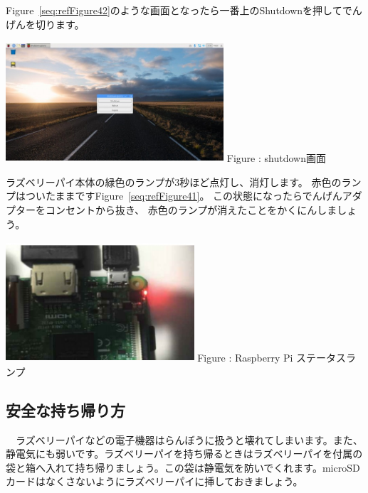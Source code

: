 \documentclass[a4paper,12pt]{jarticle}
\newcounter{Figure}
\renewcommand\theFigure{\arabic{Figure}}
\begin{document}
\flushleft
\textcolor[rgb]{0.13333334,0.13333334,0.13333334}{Figure~\ref{seq:refFigure42}のような画面となったら一番上のShutdownを押してでんげんを切ります。}
\bigskip
\centering
\begin{minipage}{8.225cm}
{\upshape
\includegraphics[width=8.1cm,height=4.5cm]{textbook-img208.jpg}
 Figure {\theFigure\label{seq:refFigure42}}: shutdown画面}
\end{minipage}

\bigskip
\flushleft
\textcolor[rgb]{0.13333334,0.13333334,0.13333334}{ラズベリーパイ本体の緑色のランプが3秒ほど点灯し、消灯します。
赤色のランプはついたままですFigure~\ref{seq:refFigure41}。
この状態になったらでんげんアダプターをコンセントから抜き、
赤色のランプが消えたことをかくにんしましょう。}

\bigskip
\centering
\begin{minipage}{8.207cm}
{\upshape
\includegraphics[width=7.0cm,height=4.5cm]{textbook-img207.jpg}
 \newline
Figure {\theFigure\label{seq:refFigure41}}: Raspberry Pi
ステータスランプ}
\end{minipage}
\clearpage\subsection{安全な持ち帰り方}
\flushleft
\ \ ラズベリーパイなどの電子機器はらんぼうに扱うと壊れてしまいます。また、静電気にも弱いです。ラズベリーパイを持ち帰るときはラズベリーパイを付属の袋と箱へ入れて持ち帰りましょう。この袋は静電気を防いでくれます。microSDカードはなくさないようにラズベリーパイに挿しておきましょう。
\end{document}
